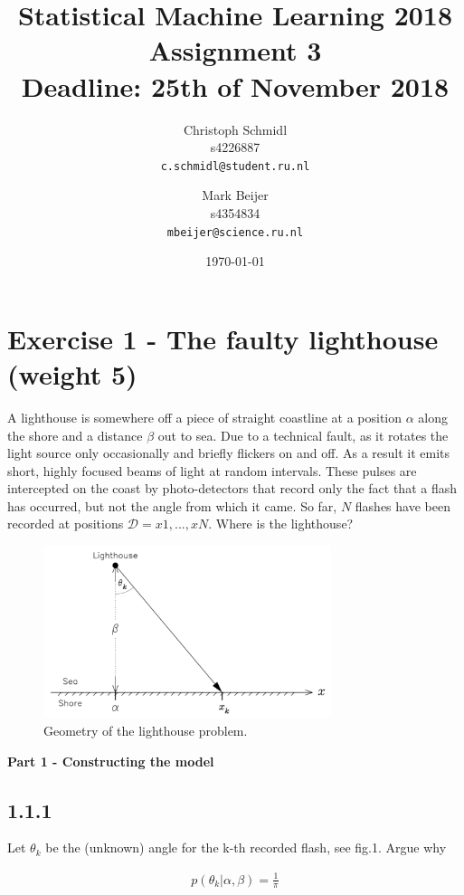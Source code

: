 \documentclass[a4paper]{article}
\title{Statistical Machine Learning 2018\\Assignment 3\\Deadline: 25th of November 2018}
\author{
  Christoph Schmidl\\ s4226887\\      \texttt{c.schmidl@student.ru.nl}
  \and
  Mark Beijer\\ s4354834\\     \texttt{mbeijer@science.ru.nl}
}
\date{\today}
\begin{document}
\maketitle


\section*{Exercise 1 - The faulty lighthouse (weight 5)}

A lighthouse is somewhere off a piece of straight coastline at a position $\alpha$ along the shore and a distance $\beta$ out to sea. Due to a technical fault, as it rotates the light source only occasionally and briefly flickers on and off. As a result it emits short, highly focused beams of light at random intervals. These pulses are intercepted on the coast by photo-detectors that record only the fact that a flash has occurred, but not the angle from which it came. So far, $N$ flashes have been recorded at positions $\mathcal{D} = {x1, . . . , xN }$. Where is the lighthouse?

\begin{figure}[H]
\center
\includegraphics[width=0.75\textwidth]{Images/lighthouse_fig.png}
\caption{Geometry of the lighthouse problem.}
\label{Fig:lighthouse}
\end{figure}




\textbf{Part 1 - Constructing the model}\\

\subsection*{1.1.1}

Let $\theta_k$ be the (unknown) angle for the k-th recorded flash, see fig.1. Argue why

\begin{eqnarray}
p(\theta_k | \alpha, \beta) = \frac{1}{\pi}
\end{eqnarray}
\end{document}

